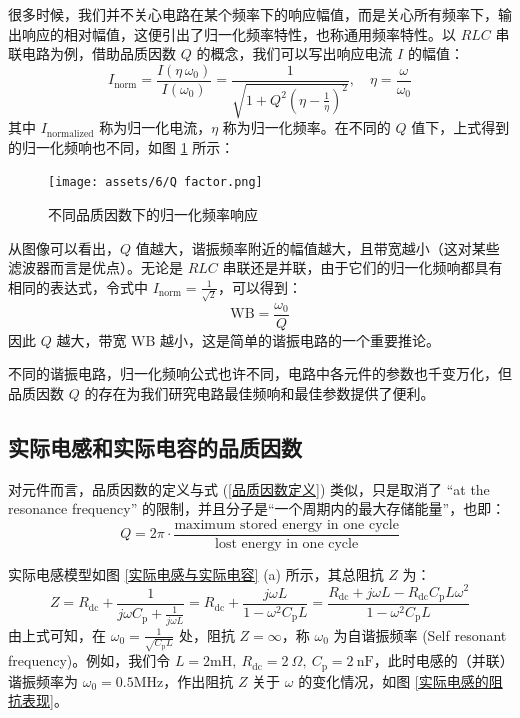 \documentclass[UTF8]{report}
\def\nF{\ \mathrm{nF}}
\theoremstyle{MyLineTheoremStyle} %
\theoremstyle{MyBlockTheoremStyle} %
\theoremstyle{MySubsubsectionStyle} %
\begin{document}
很多时候，我们并不关心电路在某个频率下的响应幅值，而是关心所有频率下，输出响应的相对幅值，这便引出了归一化频率特性，也称通用频率特性。以 $RLC$ 串联电路为例，借助品质因数 $Q$ 的概念，我们可以写出响应电流 $I$ 的幅值：
\begin{equation}
I_\text{norm} = \frac{I(\eta \, \omega_0)}{I(\omega_0)} = \frac{1}{\sqrt{ 1 + Q^2 \left(\eta - \frac{1}{\eta}\right)^2 }},\quad \eta = \frac{\omega}{\omega_0}
\end{equation}
其中 $I_\text{normalized}$ 称为归一化电流，$\eta$ 称为归一化频率。在不同的 $Q$ 值下，上式得到的归一化频响也不同，如图 \ref{不同品质因数下的归一化频率响应} 所示：
\begin{figure}[H]\centering
    \texttt{[image: assets/6/Q factor.png]}
    \caption{不同品质因数下的归一化频率响应}
    \label{不同品质因数下的归一化频率响应}
\end{figure}
从图像可以看出，$Q$ 值越大，谐振频率附近的幅值越大，且带宽越小（这对某些滤波器而言是优点）。无论是 $RLC$ 串联还是并联，由于它们的归一化频响都具有相同的表达式，令式中 $I_{\text{norm}} = \frac{1}{\sqrt{2}}$，可以得到：
\begin{equation}
\text{WB} = \frac{\omega_0}{Q} 
\end{equation}
因此 $Q$ 越大，带宽 WB 越小，这是简单的谐振电路的一个重要推论。


不同的谐振电路，归一化频响公式也许不同，电路中各元件的参数也千变万化，但品质因数 $Q$ 的存在为我们研究电路最佳频响和最佳参数提供了便利。

\subsection{实际电感和实际电容的品质因数}
对元件而言，品质因数的定义与式 (\ref{品质因数定义}) 类似，只是取消了 ``at the resonance frequency'' 的限制，并且分子是“一个周期内的最大存储能量”，也即：
\begin{equation}\label{电容电感品质因数}
Q = 2 \pi \cdot  \frac{\text{maximum stored energy in one cycle}}{\text{lost energy in one cycle}}
\end{equation}


实际电感模型如图 \ref{实际电感与实际电容} (a) 所示，其总阻抗 $Z$ 为：
\begin{equation}
Z = R_{\text{dc}} + \frac{1}{j \omega C_{\text{p}} + \frac{1}{j \omega L}} =  R_{\text{dc}} + \frac{j \omega L}{1 - \omega^2 C_\text{p}L } = \frac{R_\text{dc} + j \omega L - R_\text{dc}C_\text{p}L \omega^2}{1 - \omega^2 C_\text{p}L}
\end{equation}
由上式可知，在 $\omega_0 = \frac{1}{\sqrt{C_{\text{p}}L}}$ 处，阻抗 $Z = \infty$，称 $\omega_0$ 为自谐振频率 (Self resonant frequency)。例如，我们令 $L = 2 \mathrm{mH},\ R_{\text{dc}} = 2 \ \Omega, \ C_{\text{p}} = 2 \nF$，此时电感的（并联）谐振频率为 $\omega_0 = 0.5 \mathrm{MHz}$，作出阻抗 $Z$ 关于 $\omega$ 的变化情况，如图 \ref{实际电感的阻抗表现}。
\end{document}
